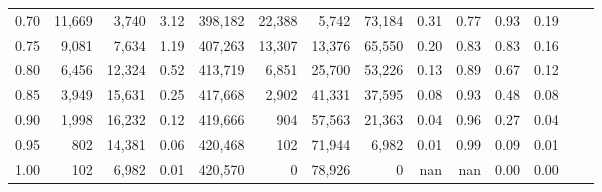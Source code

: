 \begin{tabular}{rrrrrrrrrrrrrr}
0.70 &  11,669 &   3,740 &      3.12 &  398,182 &   22,388 &   5,742 &  73,184 &  0.31 &  0.77 &  0.93 &      0.19 \\
0.75 &   9,081 &   7,634 &      1.19 &  407,263 &   13,307 &  13,376 &  65,550 &  0.20 &  0.83 &  0.83 &      0.16 \\
0.80 &   6,456 &  12,324 &      0.52 &  413,719 &    6,851 &  25,700 &  53,226 &  0.13 &  0.89 &  0.67 &      0.12 \\
0.85 &   3,949 &  15,631 &      0.25 &  417,668 &    2,902 &  41,331 &  37,595 &  0.08 &  0.93 &  0.48 &      0.08 \\
0.90 &   1,998 &  16,232 &      0.12 &  419,666 &      904 &  57,563 &  21,363 &  0.04 &  0.96 &  0.27 &      0.04 \\
0.95 &     802 &  14,381 &      0.06 &  420,468 &      102 &  71,944 &   6,982 &  0.01 &  0.99 &  0.09 &      0.01 \\
1.00 &     102 &   6,982 &      0.01 &  420,570 &        0 &  78,926 &       0 &   nan &   nan &  0.00 &      0.00 \\
\bottomrule
\end{tabular}
